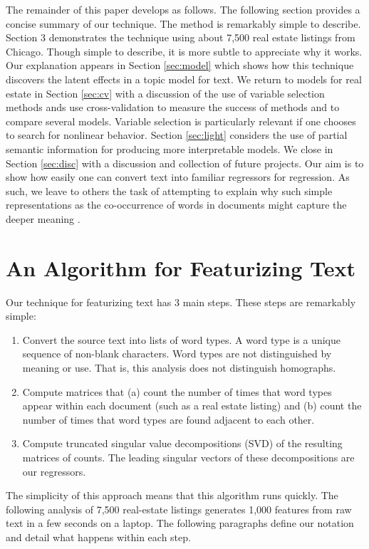 \documentclass[12pt]{article}
\begin{document}
 The remainder of this paper develops as follows.  The following section
 provides a concise summary of our technique.  The method is remarkably simple
 to describe.  Section 3 demonstrates the technique using about 7,500 real
 estate listings from Chicago.  Though simple to describe, it is more subtle to
 appreciate why it works.  Our explanation appears in Section \ref{sec:model} which shows how this technique discovers the latent effects in a topic model for text.  We return to models for real estate in Section \ref{sec:cv} with a discussion of the use of variable selection methods ands use cross-validation to measure the success of methods and to compare several models.  Variable selection is particularly relevant if one chooses to search for nonlinear behavior.  Section \ref{sec:light} considers the use of partial semantic information for producing more interpretable models.  We close in Section \ref{sec:disc} with a discussion and collection of future projects.  Our aim is to show how easily one can convert text into familiar regressors for regression.  As such, we leave to others the task of attempting to explain why such simple representations as the co-occurrence of words in documents might capture the deeper meaning  \citep{deerwester90, landauer97, bullinaria07, turney10}. 


\section{An Algorithm for Featurizing Text}
\label{sec:algo}

 Our technique for featurizing text has 3 main steps.  These steps are
 remarkably simple:
 \begin{enumerate}
   \item Convert the source text into lists of word types.  A word type is a
 unique sequence of non-blank characters.  Word types are not distinguished by meaning or use.  That is, this analysis does not distinguish homographs.
   \item Compute matrices that (a) count the number of times that word types
 appear within each document (such as a real estate listing) and (b) count the number of times that word types are found adjacent to each other.
   \item Compute truncated singular value decompositions (SVD) of the resulting
 matrices of counts. The leading singular vectors of these decompositions are our regressors.
 \end{enumerate}
   The simplicity of this approach means that this algorithm runs quickly.  The following analysis of 7,500 real-estate listings generates 1,000 features from raw text in a few seconds on a laptop.  The following paragraphs define our notation and detail what happens within each step. 
\end{document}
